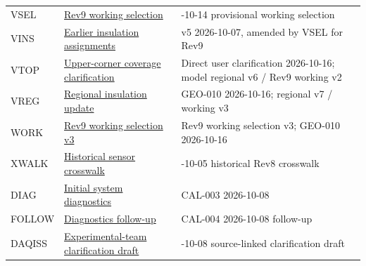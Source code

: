 \documentclass[11pt]{article}
\begin{document}
\begin{longtable}{>{\raggedright\arraybackslash}p{}>{\raggedright\arraybackslash}p{}>{\raggedright\arraybackslash}p{}}
VSEL & \href{https://github.com/Andresfierro231/Trident-Flow-Loop-Documented-Geometry/blob/main/support/evidence/2026-10-16_CFG-001_vcu_references/2026-10-14_GEO-008_rev9_working_selection.md}{Rev9 working selection} & 2026-10-14 provisional working selection\\[4pt]
VINS & \href{https://github.com/Andresfierro231/Trident-Flow-Loop-Documented-Geometry/blob/main/support/evidence/2026-10-16_CFG-001_vcu_references/insulation.yaml}{Earlier insulation assignments} & v5 2026-10-07, amended by VSEL for Rev9\\[4pt]
VTOP & \href{https://github.com/Andresfierro231/Trident-Flow-Loop-Documented-Geometry/blob/main/support/evidence/2026-10-16_GEO-009_covered_top_corners/USER_CLARIFICATION.md}{Upper-corner coverage clarification} & Direct user clarification 2026-10-16; model regional v6 / Rev9 working v2\\[4pt]
VREG & \href{https://github.com/Andresfierro231/Trident-Flow-Loop-Documented-Geometry/blob/main/support/evidence/2026-10-16_GEO-010_regional_insulation_sync/README.md}{Regional insulation update} & GEO-010 2026-10-16; regional v7 / working v3\\[4pt]
WORK & \href{https://github.com/Andresfierro231/Trident-Flow-Loop-Documented-Geometry/blob/main/support/evidence/2026-10-16_CFG-002_vcu_current_understanding/WORK_rev9_working_selection_v3.json}{Rev9 working selection v3} & Rev9 working selection v3; GEO-010 2026-10-16\\[4pt]
XWALK & \href{https://github.com/Andresfierro231/Trident-Flow-Loop-Documented-Geometry/blob/main/support/evidence/2026-10-16_CFG-002_vcu_current_understanding/XWALK_2026-10-05_VCU_WORKING_SENSOR_CROSSWALK.md}{Historical sensor crosswalk} & 2026-10-05 historical Rev8 crosswalk\\[4pt]
DIAG & \href{https://github.com/Andresfierro231/Trident-Flow-Loop-Documented-Geometry/blob/main/support/evidence/2026-10-16_CFG-002_vcu_current_understanding/DIAG_README.md}{Initial system diagnostics} & CAL-003 2026-10-08\\[4pt]
FOLLOW & \href{https://github.com/Andresfierro231/Trident-Flow-Loop-Documented-Geometry/blob/main/support/evidence/2026-10-16_CFG-002_vcu_current_understanding/FOLLOW_README.md}{Diagnostics follow-up} & CAL-004 2026-10-08 follow-up\\[4pt]
DAQISS & \href{https://github.com/Andresfierro231/Trident-Flow-Loop-Documented-Geometry/blob/main/support/evidence/2026-10-16_CFG-002_vcu_current_understanding/DAQISS_EXPERIMENTAL_TEAM_CLARIFICATION.md}{Experimental-team clarification draft} & 2026-10-08 source-linked clarification draft\\[4pt]

\end{longtable}
\end{document}
